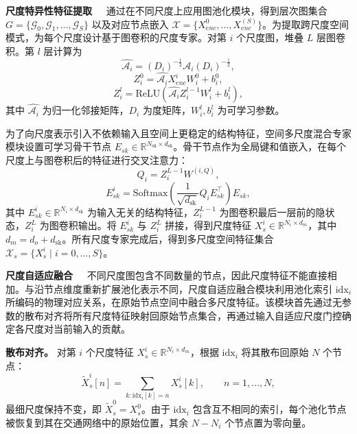 \noindent\textbf{尺度特异性特征提取\ \ } 通过在不同尺度上应用图池化模块，得到层次图集合 $G=\{\mathcal{G}_0,\mathcal{G}_1,\ldots,\mathcal{G}_S\}$ 以及对应节点嵌入 $\mathcal{X}=\{X_{enc}^0,\ldots,X_{enc}^{(S)}\}$。为提取跨尺度空间模式，为每个尺度设计基于图卷积的尺度专家。对第 $i$ 个尺度图，堆叠 $L$ 层图卷积。第 $l$ 层计算为
\begin{equation}
    \hat{\mathcal{A}_i}=\left(D_i\right)^{-\frac12}\mathcal{A}_i\left(D_i\right)^{-\frac12},
\end{equation}
\begin{equation}
    Z_i^0=\hat{\mathcal{A}_i}X_{enc}^iW^0_i+b^0_i,
\end{equation}
\begin{equation}
    Z_i^l=\mathrm{ReLU}\!\left(\hat{\mathcal{A}_i}Z_i^{l-1}W^l_i+b^l_i\right),
\end{equation}
其中 $\hat{\mathcal{A}_i}$ 为归一化邻接矩阵，$D_i$ 为度矩阵，$W^l_i,b^l_i$ 为可学习参数。

为了向尺度表示引入不依赖输入且空间上更稳定的结构特征，空间多尺度混合专家模块设置可学习骨干节点 $E_{sk}\in\mathbb{R}^{N_{\mathrm{sk}}\times d_{\mathrm{sk}}}$。骨干节点作为全局键和值嵌入，在每个尺度上与图卷积后的特征进行交叉注意力：
\begin{equation}
    Q_i=Z_i^{L-1}W^{(i,Q)},
\end{equation}
\begin{equation}
    E_{sk}^i=\mathrm{Softmax}\!\left(\frac{1}{\sqrt{d_{\mathrm{sk}}}}Q_iE_{sk}^{\top}\right)E_{sk},
\end{equation}
其中 $E_{sk}^i\in\mathbb{R}^{N_i\times d_{\mathrm{sk}}}$ 为输入无关的结构特征，$Z_i^{L-1}$ 为图卷积最后一层前的隐状态，$Z_i^L$ 为图卷积输出。将 $E_{sk}^i$ 与 $Z_i^L$ 拼接，得到尺度特征 $X_s^i\in\mathbb{R}^{N_i\times d_m}$，其中 $d_m=d_o+d_{\mathrm{sk}}$。所有尺度专家完成后，得到多尺度空间特征集合 $\mathcal{X}_s=\{X_s^i\mid i=0,\ldots,S\}$。

\noindent\textbf{尺度自适应融合\ \ }
不同尺度图包含不同数量的节点，因此尺度特征不能直接相加。与沿节点维度重新扩展池化表示不同，尺度自适应融合模块利用池化索引 $\mathrm{idx}_i$ 所编码的物理对应关系，在原始节点空间中融合多尺度特征。该模块首先通过无参数的散布对齐将所有尺度特征映射回原始节点集合，再通过输入自适应尺度门控确定各尺度对当前输入的贡献。

\textbf{散布对齐。} 对第 $i$ 个尺度特征 $X_s^i\in\mathbb{R}^{N_i\times d_m}$，根据 $\mathrm{idx}_i$ 将其散布回原始 $N$ 个节点：
\begin{equation}
\tilde{X}_s^i[n]=\sum_{k:\mathrm{idx}_i[k]=n}X_s^i[k],
\qquad n=1,\ldots,N,
\end{equation}
最细尺度保持不变，即 $\tilde{X}_s^0=X_s^0$。由于 $\mathrm{idx}_i$ 包含互不相同的索引，每个池化节点被恢复到其在交通网络中的原始位置，其余 $N-N_i$ 个节点置为零向量。

